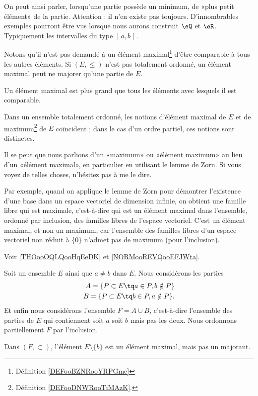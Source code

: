 \begin{normaltext}\label{NORMooPlusPetitElement}
	On peut ainsi parler, lorsqu'une partie possède un minimum, de «plus petit élément» de la partie. Attention : il n'en existe pas toujours. D'innombrables exemples pourront être vus lorsque nous aurons construit \( \eQ\) et \( \eR\). Typiquement les intervalles du type \( \mathopen] a , b \mathclose[\).
\end{normaltext}


\begin{normaltext}    \label{NORMooVHIBooJAOsou}
	Notons qu'il n'est pas demandé à un élément maximal\footnote{Définition \ref{DEFooBZNRooYRPGme}} d'être comparable à tous les autres éléments. Si \( (E,\leq)\) n'est pas totalement ordonné, un élément maximal peut ne majorer qu'une partie de \( E\).

	Un élément maximal est plus grand que tous les éléments avec lesquels il est comparable.

	Dans un ensemble totalement ordonné, les notions d'élément maximal de \( E\) et de maximum\footnote{Définition \ref{DEFooDNWRooTiMAzK}.} de \( E\) coïncident ; dans le cas d'un ordre partiel, ces notions sont distinctes.

	Il se peut que nous parlions d'un «maximum» ou «élément maximum»  au lieu d'un «élément maximal», en particulier en utilisant le lemme de Zorn. Si vous voyez de telles choses, n'hésitez pas à me le dire.

	Par exemple, quand on applique le lemme de Zorn pour démontrer l'existence d'une base dans un espace vectoriel de dimension infinie, on obtient une famille libre qui est maximale, c'est-à-dire qui est un élément maximal dans l'ensemble, ordonné par inclusion, des familles libres de l'espace vectoriel. C'est un élément maximal, et non un maximum, car l'ensemble des familles libres d'un espace vectoriel non réduit à \( \{ 0 \}\) n'admet pas de maximum (pour l'inclusion).

	Voir \ref{THOooOQLQooHqEeDK} et \ref{NORMooREVQooEFJWta}.		%
\end{normaltext}

\begin{example} \label{ExeooMaximalPasMajorant}
	Soit un ensemble \( E\) ainsi que \( a\neq b\) dans \( E\). Nous considérons les parties
	\begin{subequations}
		\begin{align}
			A=\{ P\subset E\tq a\in P,b\notin P \} \\
			B=\{ P\subset E\tq b\in P,a\notin P \}.
		\end{align}
	\end{subequations}
	Et enfin nous considérons l'ensemble \( F=A\cup B\), c'est-à-dire l'ensemble des parties de \( E\) qui contiennent soit \( a\) soit \( b\) mais pas les deux. Nous ordonnons partiellement \( F\) par l'inclusion.

	Dans \( (F,\subset)\), l'élément \( E\setminus\{ b \}\) est un élément maximal, mais pas un majorant.
\end{example}


